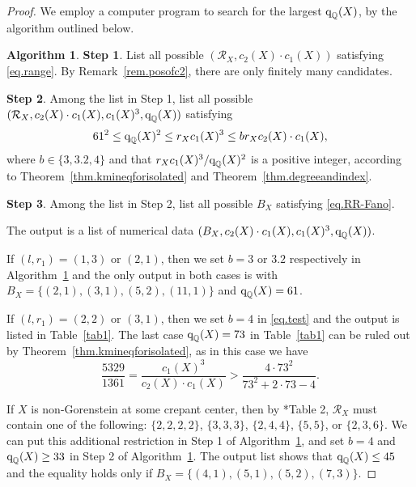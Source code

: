 \documentclass[12pt,twoside]{amsart}
\newcommand{\qQ}{\text{\rm q}_{\mathbb{Q}}}
\theoremstyle{definition}
\newtheorem{algo}[thm]{Algorithm}
\begin{document}
\begin{proof}
    We employ a computer program to search for the largest $\qQ(X)$, by the algorithm outlined below.
    
    \begin{algo}\label{algo1}
        {\bf Step 1}. List all possible $(\mathcal R_X, c_2(X)\cdot c_1(X))$ satisfying \eqref{eq.range}. By Remark~\ref{rem.posofc2}, there are only finitely many candidates.
        
        {\bf Step 2}. Among the list in Step 1, list all possible 
        $(\mathcal R_X, c_2(X)\cdot c_1(X), c_1(X)^3, \qQ(X))$ satisfying
        \begin{equation}\label{eq.test}
        61^2\leq \qQ(X)^2\leq r_Xc_1(X)^3\leq br_Xc_2(X)\cdot c_1(X),
        \end{equation}
        where $b\in \{3, 3.2, 4\}$ and that $r_Xc_1(X)^3/\qQ(X)^2$ is a positive integer, according to Theorem~\ref{thm.kmineqforisolated} and Theorem~\ref{thm.degreeandindex}.
        
        {\bf Step 3}. Among the list in Step 2, 
        list all possible $B_X$ satisfying \eqref{eq.RR-Fano}. 
        
        The output is a list of numerical data $(B_X, c_2(X)\cdot c_1(X), c_1(X)^3, \qQ(X))$.
    \end{algo}
 
    If $(l, r_1)=(1,3)$ or $(2,1)$, then we set $b=3$ or $3.2$ respectively in Algorithm~\ref{algo1} and the only output in both cases is with $B_X=\{(2,1),(3,1),(5,2), (11,1)\}$ and $\qQ(X)=61$. 

    If $(l, r_1)=(2,2)$ or $(3,1)$, then we set $b=4$ in \eqref{eq.test} and the output is listed in Table~\ref{tab1}. The last case $\qQ(X)=73$ in Table~\ref{tab1} can be ruled out by Theorem~\ref{thm.kmineqforisolated}, as in this case we have
    \[
        \frac{5329}{1361}=\frac{c_1(X)^3}{c_2(X)\cdot c_1(X)}>\frac{4\cdot 73^2}{ 73^2+2\cdot 73-4}.
    \]

    If $X$ is non-Gorenstein at some crepant center, then by \cite{kawakita}*{Table 2}, $\mathcal R_X$ must contain one of the following: $\{2,2,2,2\}$, $\{3,3,3\}$, $\{2,4,4\}$, $\{5,5\}$, or $\{2,3,6\}$. We can put this additional restriction in Step 1 of Algorithm~\ref{algo1}, and set $b=4$ and $\qQ(X)\geq 33$ in Step 2 of Algorithm~\ref{algo1}. The output list shows that $\qQ(X)\leq 45$ and the equality holds only if $B_X=\{(4, 1), (5, 1), (5, 2), (7, 3)\}$. 
\end{proof}
\end{document}
